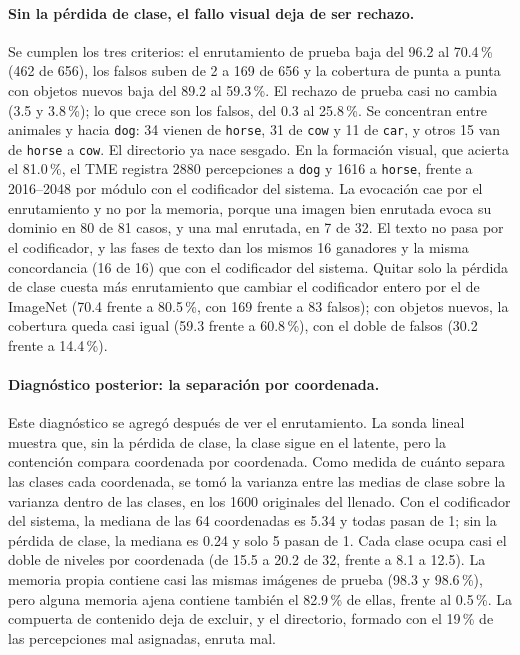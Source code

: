 \paragraph{Sin la pérdida de clase, el fallo visual deja de ser rechazo.}
Se cumplen los tres criterios: el enrutamiento de prueba baja del 96.2 al 70.4\,\% (462
de 656), los falsos suben de 2 a 169 de 656 y la cobertura de punta a punta con objetos
nuevos baja del 89.2 al 59.3\,\%.
El rechazo de prueba casi no cambia (3.5 y 3.8\,\%); lo que crece son los falsos, del 0.3
al 25.8\,\%.
Se concentran entre animales y hacia \texttt{dog}: 34 vienen de \texttt{horse}, 31 de
\texttt{cow} y 11 de \texttt{car}, y otros 15 van de \texttt{horse} a \texttt{cow}.
El directorio ya nace sesgado.
En la formación visual, que acierta el 81.0\,\%, el TME registra 2880 percepciones a
\texttt{dog} y 1616 a \texttt{horse}, frente a 2016--2048 por módulo con el codificador
del sistema.
La evocación cae por el enrutamiento y no por la memoria, porque una imagen bien
enrutada evoca su dominio en 80 de 81 casos, y una mal enrutada, en 7 de 32.
El texto no pasa por el codificador, y las fases de texto dan los mismos 16 ganadores y
la misma concordancia (16 de 16) que con el codificador del sistema.
Quitar solo la pérdida de clase cuesta más enrutamiento que cambiar el codificador
entero por el de ImageNet (70.4 frente a 80.5\,\%, con 169 frente a 83 falsos); con
objetos nuevos, la cobertura queda casi igual (59.3 frente a 60.8\,\%), con el doble de
falsos (30.2 frente a 14.4\,\%).

\paragraph{Diagnóstico posterior: la separación por coordenada.}
Este diagnóstico se agregó después de ver el enrutamiento.
La sonda lineal muestra que, sin la pérdida de clase, la clase sigue en el latente, pero
la contención compara coordenada por coordenada.
Como medida de cuánto separa las clases cada coordenada, se tomó la varianza entre las
medias de clase sobre la varianza dentro de las clases, en los 1600 originales del
llenado.
Con el codificador del sistema, la mediana de las 64 coordenadas es 5.34 y todas pasan
de 1; sin la pérdida de clase, la mediana es 0.24 y solo 5 pasan de 1.
Cada clase ocupa casi el doble de niveles por coordenada (de 15.5 a 20.2 de 32, frente a
8.1 a 12.5).
La memoria propia contiene casi las mismas imágenes de prueba (98.3 y 98.6\,\%), pero
alguna memoria ajena contiene también el 82.9\,\% de ellas, frente al 0.5\,\%.
La compuerta de contenido deja de excluir, y el directorio, formado con el 19\,\% de las
percepciones mal asignadas, enruta mal.

